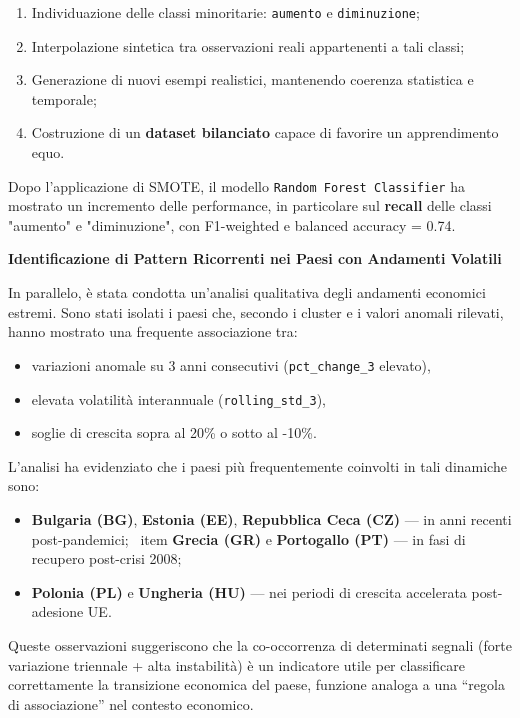 \documentclass[conference]{IEEEtran}
\begin{document}
\begin{enumerate} \item Individuazione delle classi minoritarie: \texttt{aumento} e \texttt{diminuzione}; \item Interpolazione sintetica tra osservazioni reali appartenenti a tali classi; \item Generazione di nuovi esempi realistici, mantenendo coerenza statistica e temporale; \item Costruzione di un \textbf{dataset bilanciato} capace di favorire un apprendimento equo. \end{enumerate}

Dopo l’applicazione di SMOTE, il modello \texttt{Random Forest Classifier} ha mostrato un incremento delle performance, in particolare sul \textbf{recall} delle classi "aumento" e "diminuzione", con F1-weighted e balanced accuracy = 0.74.

\vspace{1em}\noindent\textbf{Identificazione di Pattern Ricorrenti nei Paesi con Andamenti Volatili}

In parallelo, è stata condotta un’analisi qualitativa degli andamenti economici estremi. Sono stati isolati i paesi che, secondo i cluster e i valori anomali rilevati, hanno mostrato una frequente associazione tra:

{\raggedright
\begin{itemize} 
\item variazioni anomale su 3 anni consecutivi (\texttt{pct\_change\_3} elevato), 
\item elevata volatilità interannuale (\texttt{rolling\_std\_3}), 
\item soglie di crescita sopra al 20\% o sotto al -10\%. 
\end{itemize}
L’analisi ha evidenziato che i paesi più frequentemente coinvolti in tali dinamiche sono:
\begin{itemize} 
\item \textbf{Bulgaria (BG)}, \textbf{Estonia (EE)}, \textbf{Repubblica Ceca (CZ)} — in anni recenti post-pandemici; \
item \textbf{Grecia (GR)} e \textbf{Portogallo (PT)} — in fasi di recupero post-crisi 2008; 
\item \textbf{Polonia (PL)} e \textbf{Ungheria (HU)} — nei periodi di crescita accelerata post-adesione UE. 
\end{itemize}
}
Queste osservazioni suggeriscono che la co-occorrenza di determinati segnali (forte variazione triennale + alta instabilità) è un indicatore utile per classificare correttamente la transizione economica del paese, funzione analoga a una “regola di associazione” nel contesto economico.
\end{document}
